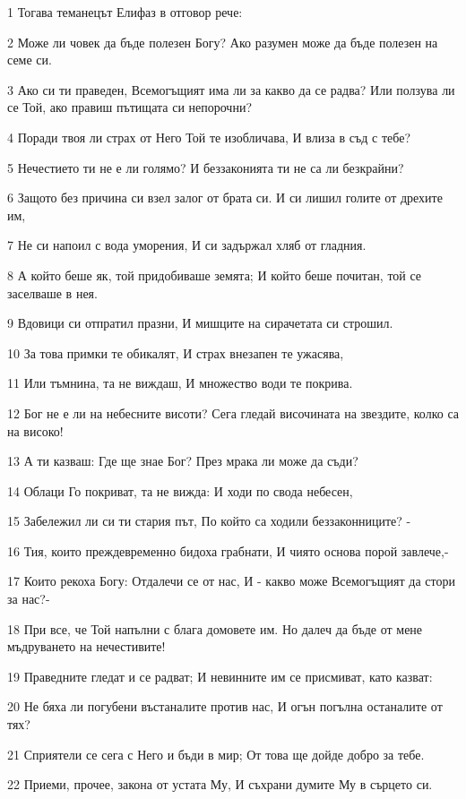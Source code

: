 \par 1 Тогава теманецът Елифаз в отговор рече:
\par 2 Може ли човек да бъде полезен Богу? Ако разумен може да бъде полезен на семе си.
\par 3 Ако си ти праведен, Всемогъщият има ли за какво да се радва? Или ползува ли се Той, ако правиш пътищата си непорочни?
\par 4 Поради твоя ли страх от Него Той те изобличава, И влиза в съд с тебе?
\par 5 Нечестието ти не е ли голямо? И беззаконията ти не са ли безкрайни?
\par 6 Защото без причина си взел залог от брата си. И си лишил голите от дрехите им,
\par 7 Не си напоил с вода уморения, И си задържал хляб от гладния.
\par 8 А който беше як, той придобиваше земята; И който беше почитан, той се заселваше в нея.
\par 9 Вдовици си отпратил празни, И мишците на сирачетата си строшил.
\par 10 За това примки те обикалят, И страх внезапен те ужасява,
\par 11 Или тъмнина, та не виждаш, И множество води те покрива.
\par 12 Бог не е ли на небесните висоти? Сега гледай височината на звездите, колко са на високо!
\par 13 А ти казваш: Где ще знае Бог? През мрака ли може да съди?
\par 14 Облаци Го покриват, та не вижда: И ходи по свода небесен,
\par 15 Забележил ли си ти стария път, По който са ходили беззаконниците? -
\par 16 Тия, които преждевременно бидоха грабнати, И чиято основа порой завлече,-
\par 17 Които рекоха Богу: Отдалечи се от нас, И - какво може Всемогъщият да стори за нас?-
\par 18 При все, че Той напълни с блага домовете им. Но далеч да бъде от мене мъдруването на нечестивите!
\par 19 Праведните гледат и се радват; И невинните им се присмиват, като казват:
\par 20 Не бяха ли погубени въстаналите против нас, И огън погълна останалите от тях?
\par 21 Сприятели се сега с Него и бъди в мир; От това ще дойде добро за тебе.
\par 22 Приеми, прочее, закона от устата Му, И съхрани думите Му в сърцето си.
